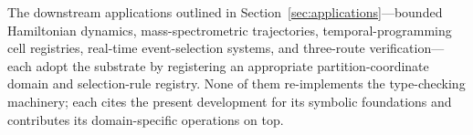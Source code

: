 \documentclass[twocolumn,11pt,a4paper]{article}
\begin{document}
The downstream applications outlined in Section~\ref{sec:applications}---bounded Hamiltonian dynamics, mass-spectrometric trajectories, temporal-programming cell registries, real-time event-selection systems, and three-route verification---each adopt the substrate by registering an appropriate partition-coordinate domain and selection-rule registry. None of them re-implements the type-checking machinery; each cites the present development for its symbolic foundations and contributes its domain-specific operations on top.



\end{document}
